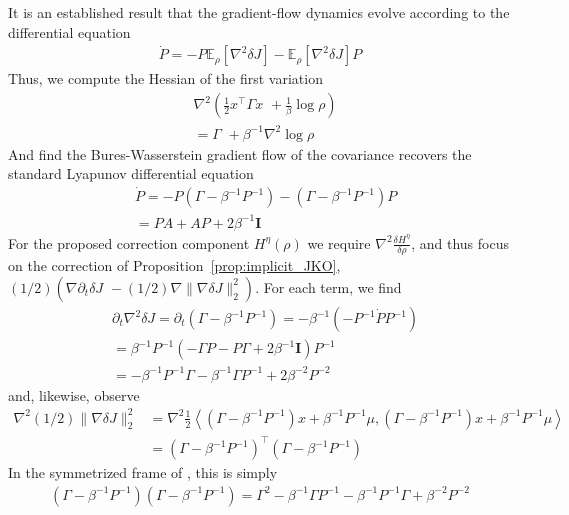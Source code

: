 \documentclass[reqno,11pt,letterpaper]{amsart}
\theoremstyle{plain}
\theoremstyle{definition}
\theoremstyle{remark}
\newcommand{\id}{\mathbf{I}}
\begin{document}
It is an established result that the gradient-flow dynamics evolve according to the differential equation \cite{chewi2024statistical}
\begin{align}\label{eq:BW_dyn}
    \dot{P} = - P \mathbb{E}_{\rho} [\nabla^{2} \delta J] - \mathbb{E}_{\rho} [ \nabla^{2} \delta J ] P
\end{align}
Thus, we compute the Hessian of the first variation
\begin{align*}
    &\nabla^{2} \left(
    \frac{1}{2} x^{\top} \Gamma x \,\, + \frac{1}{\beta} \log\rho
    \right) \\
    &= \Gamma \,\, + \beta^{-1} \nabla^{2} \log\rho
\end{align*}
And find the Bures-Wasserstein gradient flow \cite{chewi2024statistical} of the covariance recovers the standard Lyapunov differential equation \cite{Halder2017}
\begin{align*}
    &\dot{P} = -P(\Gamma - \beta^{-1} P^{-1}) - (\Gamma - \beta^{-1} P^{-1})P \\
    &= PA + AP + 2\beta^{-1} \id
\end{align*}
For the proposed correction component $H^{\eta}(\rho)$ we require $\nabla^{2} \frac{\delta H^{\eta}}{\delta \rho}$, and thus focus on the correction of Proposition~\ref{prop:implicit_JKO}, $(1/2) ( \nabla \partial_{t} \delta J \, \, - (1/2) \nabla \lVert \nabla \delta J \rVert_{2}^{2} )$. For each term, we find
\begin{align*}
    &\partial_{t} \nabla^{2} \delta J = \partial_{t} ( \Gamma - \beta^{-1} P^{-1}) = - \beta^{-1} (- P^{-1} \dot{P} P^{-1})  \\
    &= \beta^{-1} P^{-1} (-\Gamma P - P \Gamma + 2 \beta^{-1} \id) P^{-1} \\
    &= -\beta^{-1} P^{-1} \Gamma - \beta^{-1} \Gamma P^{-1} + 2\beta^{-2} P^{-2}
\end{align*}
and, likewise, observe
\begin{align*}
    \nabla^{2} (1/2) \lVert \nabla \delta J \rVert_{2}^{2} &= \nabla^{2} \frac{1}{2} \left\langle (\Gamma -\beta^{-1} P^{-1})x + \beta^{-1} P^{-1} \mu, (\Gamma -\beta^{-1} P^{-1})x + \beta^{-1} P^{-1} \mu\right\rangle \\
    &= (\Gamma -\beta^{-1} P^{-1})^{\top} (\Gamma -\beta^{-1} P^{-1})
\end{align*}
In the symmetrized frame of \cite{Halder2017}, this is simply
\begin{align*}
    (\Gamma -\beta^{-1} P^{-1}) (\Gamma -\beta^{-1} P^{-1}) = \Gamma^{2} - \beta^{-1} \Gamma P^{-1} -\beta^{-1} P^{-1} \Gamma + \beta^{-2} P^{-2}
\end{align*}
\end{document}
